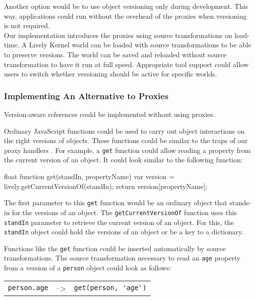 Another option would be to use object versioning only during development.
This way, applications could run without the overhead of the proxies when versioning is not required.\\
Our implementation introduces the proxies using source transformations on load-time.
A Lively Kernel world can be loaded with source transformations to be able to preserve versions.
The world can be saved and reloaded without source transformation to have it run at full speed.
Appropriate tool support could allow users to switch whether versioning should be active for specific worlds.


\subsubsection{Implementing An Alternative to Proxies}

Version-aware references could be implemented without using proxies.

Ordinary JavaScript functions could be used to carry out object interactions on the right versions of objects.
These functions could be similar to the traps of our proxy handlers .
For example, a \lstinline{get} function could allow reading a property from the current version of an object.
It could look similar to the following function:

\iffalse
\begin{verbatim}\fi
\begin{code}{}{float}
function get(standIn, propertyName) {
    var version = lively.getCurrentVersionOf(standIn);
    return version[propertyName];
}
\end{code}
\iffalse
\end{verbatim}\fi

The first parameter to this \lstinline{get} function would be an ordinary object that stands-in for the versions of an object.
The \lstinline{getCurrentVersionOf} function uses this \lstinline{standIn} parameter to retrieve the current version of an object.
For this, the \lstinline{standIn} object could hold the versions of an object or be a key to a dictionary.

Functions like the \lstinline{get} function could be inserted automatically by source transformations.
The source transformation necessary to read an \lstinline{age} property from a version of a \lstinline{person} object could look as follows:

\begin{center}
    \begin{tabular}{ lll }
    \lstinline|person.age| & --> & \lstinline|get(person, 'age')| \\
    \end{tabular}
\end{center}

